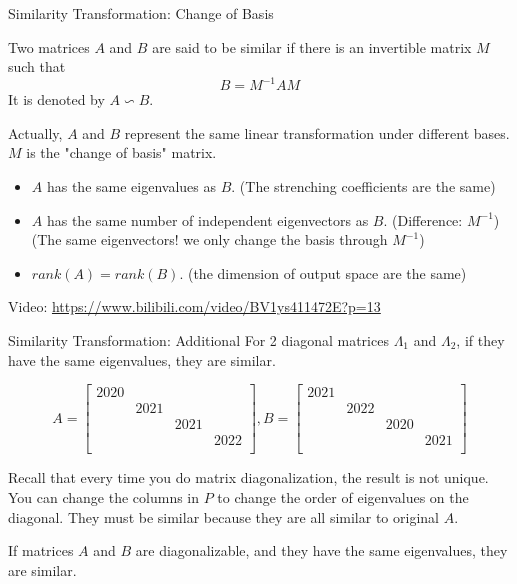 \documentclass{beamer}
\begin{document}
\begin{frame}{Similarity Transformation: Change of Basis}
    \begin{definition}
        Two matrices $A$ and $B$ are said to be similar if there is an invertible matrix $M$ such that
        \begin{equation*}
            B=M^{-1}AM
        \end{equation*}
        It is denoted by $A\backsim B$.
    \end{definition}

Actually, $A$ and $B$ represent the same linear transformation under different bases. $M$ is the "change of basis" matrix.

\begin{itemize}
    \item $A$ has the same eigenvalues as $B$. (The strenching coefficients are the same)
    \item $A$ has the same number of independent eigenvectors as $B$. (Difference: $M^{-1}$) (The same eigenvectors! we only change the basis through $M^{-1}$)
    \item $rank (A) = rank (B)$. (the dimension of output space are the same)
\end{itemize}

Video: \url{https://www.bilibili.com/video/BV1ys411472E?p=13}

\end{frame}

\begin{frame}{Similarity Transformation: Additional}
For 2 diagonal matrices $\varLambda_1$ and $\varLambda_2$, if they have the same eigenvalues, they are similar.

\begin{equation*}
    A=\left[ \begin{matrix}
        2020&		&		&		\\
        &		2021&		&		\\
        &		&		2021&		\\
        &		&		&		2022\\
    \end{matrix} \right] , B=\left[ \begin{matrix}
        2021&		&		&		\\
        &		2022&		&		\\
        &		&		2020&		\\
        &		&		&		2021\\
    \end{matrix} \right]
\end{equation*}

Recall that every time you do matrix diagonalization, the result is not unique. You can change the columns in $P$ to change the order of eigenvalues on the diagonal. They must be similar because they are all similar to original $A$.

\vspace{3pt}
If matrices $A$ and $B$ are diagonalizable, and they have the same eigenvalues, they are similar.

\end{frame}
\end{document}
